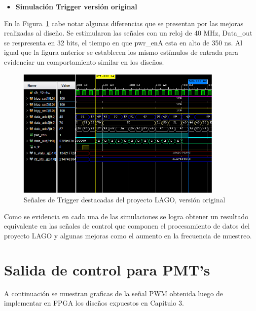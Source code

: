\begin{itemize}
    \item {\textbf{Simulación Trigger versión original}}
    
\end{itemize}

En  la Figura~\ref{trigerlago} cabe notar algunas diferencias que se presentan por las mejoras realizadas al diseño. Se estimularon las señales con un reloj de 40 MHz, Data\_out se respresenta en 32 bits, el tiempo en que pwr\_enA esta en alto de 350 ns. Al igual que la figura anterior se establecen los mismo estímulos de entrada para evidenciar un comportamiento similar en los diseños.
\begin{figure}[H]
\includegraphics[width=0.9\textwidth]{Figs/trigerviejo.PNG} 
\centering
\caption{Señales de Trigger destacadas del proyecto LAGO, versión original}
\label{trigerlago}
\end{figure}

Como se evidencia en cada una de las simulaciones se logra obtener un resultado equivalente en las señales de control que componen el procesamiento de datos del proyecto LAGO y algunas mejoras como el aumento en la frecuencia de muestreo.

\section{\textbf{Salida de control para PMT's}}
A continuación se muestran graficas de la señal PWM obtenida luego de implementar en FPGA los diseños expuestos en Capítulo 3.


